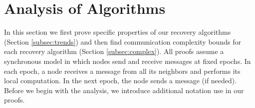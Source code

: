 
\section{Analysis of Algorithms}
\label{sec:analysis}

In this section we first prove specific properties of our recovery algorithms (Section \ref{subsec:trends}) and then find communication complexity bounds for each recovery
algorithm (Section \ref{subsec:complex}). All proofs assume a synchronous model in which nodes send and receive messages at fixed epochs. 
In each epoch, a node receives a message from all its neighbors and performs its local computation. In the next epoch, the node sends a message (if needed). 
Before we begin with the analysis, we introduce additional notation use in our proofs.


